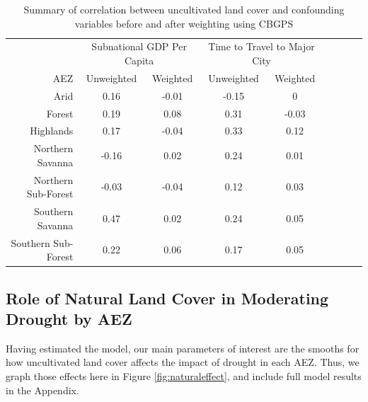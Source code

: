 \documentclass{article}
\begin{document}
\begin{table}[h!]
	\begin{center}
		\begin{tabular}{r | c c c c c c c c }
			\cmidrule(lr){2-3}\cmidrule(lr){4-5}
	&	\multicolumn{2}{c}{Subnational GDP Per Capita}			&	\multicolumn{2}{c}{Time to Travel to Major City}			\\
	\cmidrule(lr){2-3}\cmidrule(lr){4-5}
AEZ	&	Unweighted	&	Weighted	&	Unweighted	&	Weighted	\\
\hline									
Arid	&	0.16	&	-0.01	&	-0.15	&	0	\\
Forest	&	0.19	&	0.08	&	0.31	&	-0.03	\\
Highlands	&	0.17	&	-0.04	&	0.33	&	0.12	\\
Northern Savanna	&	-0.16	&	0.02	&	0.24	&	0.01	\\
Northern Sub-Forest	&	-0.03	&	-0.04	&	0.12	&	0.03	\\
Southern Savanna	&	0.47	&	0.02	&	0.24	&	0.05	\\
Southern Sub-Forest	&	0.22	&	0.06	&	0.17	&	0.05	\\
\end{tabular}
\caption{Summary of correlation between uncultivated land cover and confounding variables before and after weighting using CBGPS}
\label{tab:CBPSsum2}
\end{center}
\end{table}


\subsection{Role of Natural Land Cover in Moderating Drought by AEZ}

Having estimated the model, our main parameters of interest are the smooths for how uncultivated land cover affects the impact of drought in each AEZ.  Thus, we graph those effects here in Figure \ref{fig:naturaleffect}, and include full model results in the Appendix.
\end{document}
